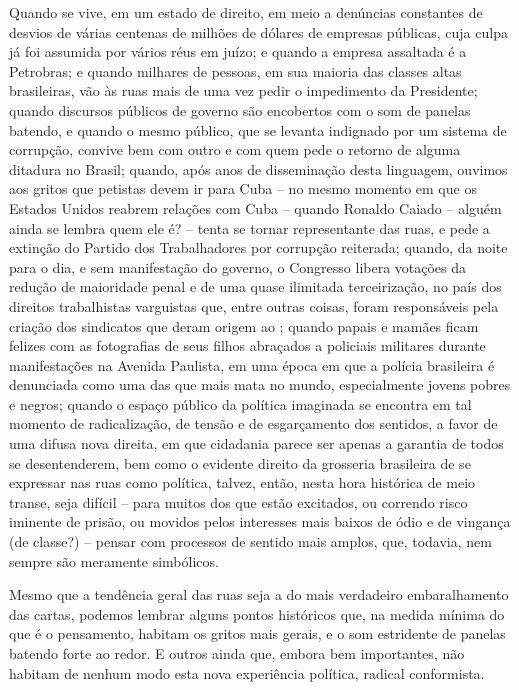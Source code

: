 Quando se vive, em um estado de direito, em meio a denúncias constantes
de desvios de várias centenas de milhões de dólares de empresas
públicas, cuja culpa já foi assumida por vários réus em juízo; e quando
a empresa assaltada é a Petrobras; e quando milhares de pessoas, em sua
maioria das classes altas brasileiras, vão às ruas mais de uma vez pedir
o impedimento da Presidente; quando discursos públicos de governo são
encobertos com o som de panelas batendo, e quando o mesmo público, que
se levanta indignado por um sistema de corrupção, convive bem com outro
e com quem pede o retorno de alguma ditadura no Brasil; quando, após
anos de disseminação desta linguagem, ouvimos aos gritos que petistas
devem ir para Cuba -- no mesmo momento em que os Estados Unidos reabrem
relações com Cuba -- quando Ronaldo Caiado -- alguém ainda se lembra
quem ele é? -- tenta se tornar representante das ruas, e pede a extinção
do Partido dos Trabalhadores por corrupção reiterada; quando, da noite
para o dia, e sem manifestação do governo, o Congresso libera votações
da redução de maioridade penal e de uma quase ilimitada terceirização,
no país dos direitos trabalhistas varguistas que, entre outras coisas,
foram responsáveis pela criação dos sindicatos que deram origem ao ;
quando papais e mamães ficam felizes com as fotografias de seus filhos
abraçados a policiais militares durante manifestações na Avenida
Paulista, em uma época em que a polícia brasileira é denunciada como uma
das que mais mata no mundo, especialmente jovens pobres e negros; quando
o espaço público da política imaginada se encontra em tal momento de
radicalização, de tensão e de esgarçamento dos sentidos, a favor de uma
difusa nova direita, em que cidadania parece ser apenas a garantia de
todos se desentenderem, bem como o evidente direito da grosseria
brasileira de se expressar nas ruas como política, talvez, então, nesta
hora histórica de meio transe, seja difícil -- para muitos dos que estão
excitados, ou correndo risco iminente de prisão, ou movidos pelos
interesses mais baixos de ódio e de vingança (de classe?) -- pensar com
processos de sentido mais amplos, que, todavia, nem sempre são meramente
simbólicos.

Mesmo que a tendência geral das ruas seja a do mais verdadeiro
embaralhamento das cartas, podemos lembrar alguns pontos históricos que,
na medida mínima do que é o pensamento, habitam os gritos mais gerais, e
o som estridente de panelas batendo forte ao redor. E outros ainda que,
embora bem importantes, não habitam de nenhum modo esta nova experiência
política, radical conformista.

